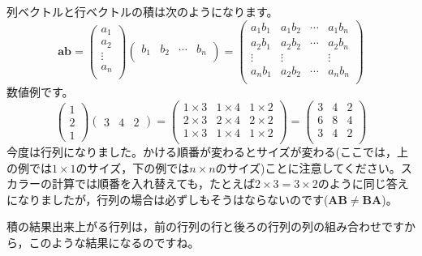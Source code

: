 \documentclass{ltjsbook}
\begin{document}
列ベクトルと行ベクトルの積は次のようになります。
\[
    \bm{a} \bm{b} =
    \begin{pmatrix}
        a_1    \\
        a_2    \\
        \vdots \\
        a_n    \\
    \end{pmatrix}
    \begin{pmatrix}
        b_1 & b_2 & \cdots & b_n \\
    \end{pmatrix}
    =
    \begin{pmatrix}
        a_1 b_1 & a_1 b_2 & \cdots & a_1 b_n \\
        a_2 b_1 & a_2 b_2 & \cdots & a_2 b_n \\
        \vdots  & \vdots  &        & \vdots  \\
        a_n b_1 & a_2 b_2 & \cdots & a_n b_n \\
    \end{pmatrix}
\]
数値例です。
\[
    \begin{pmatrix}
        1 \\2\\1
    \end{pmatrix}
    \begin{pmatrix}
        3 & 4 & 2
    \end{pmatrix}
    =
    \begin{pmatrix}
        1 \times 3 & 1 \times 4 & 1 \times 2 \\
        2 \times 3 & 2 \times 4 & 2 \times 2 \\
        1 \times 3 & 1 \times 4 & 1 \times 2 \\
    \end{pmatrix}
    =
    \begin{pmatrix}
        3 & 4 & 2 \\
        6 & 8 & 4 \\
        3 & 4 & 2 \\
    \end{pmatrix}
\]
今度は行列になりました。かける順番が変わるとサイズが変わる(ここでは，上の例では$1\times 1$のサイズ，下の例では$n \times n$のサイズ)ことに注意してください。スカラーの計算では順番を入れ替えても，たとえば$2 \times 3=3\times 2$のように同じ答えになりましたが，行列の場合は必ずしもそうはならないのです($\bm{AB} \neq \bm{BA}$)。

積の結果出来上がる行列は，前の行列の行と後ろの行列の列の組み合わせですから，このような結果になるのですね。
\end{document}
